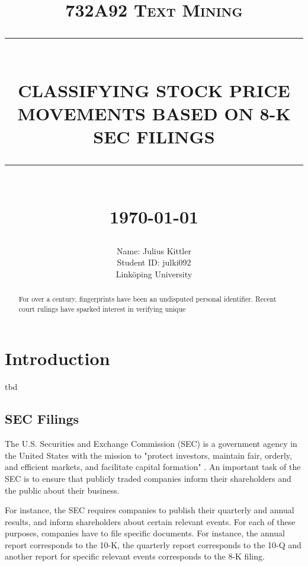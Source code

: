 \documentclass{article}
\newcommand{\HRule}[1]{\rule{\linewidth}{#1}}
\begin{document}
	
	\title{\textsc{732A92 Text Mining} \\ [2.0cm]
		\HRule{0.5pt} \\
		\LARGE \textbf{\uppercase{Classifying Stock Price Movements based on 8-K SEC filings}}
		\HRule{2pt} \\ [0.5cm]
		\normalsize \today \vspace*{5\baselineskip}}
	
	\date{}
	
	\author{
		Name: Julius Kittler \\ 
		Student ID: julki092 \\ 
		Link\"{o}ping University}
	
	\maketitle
	\newpage
	
	\begin{abstract}
		For over a century, fingerprints have been an undisputed
		personal identifier.  Recent court rulings have sparked
		interest in verifying unique
	\end{abstract}

	\tableofcontents
	\newpage

	\section{Introduction}
	
	tbd

	\subsection{SEC Filings}
	
	The U.S. Securities and Exchange Commission (SEC) is a government agency in the United States with the mission to "protect investors, maintain fair, orderly, and efficient markets, and facilitate capital formation" \cite{noauthor_sec.gov_nodate}. An important task of the SEC is to ensure that publicly traded companies inform their shareholders and the public about their business.
	
	For instance, the SEC requires companies to publish their quarterly and annual results, and inform shareholders about certain relevant events. For each of these purposes, companies have to file specific documents. For instance, the annual report corresponds to the 10-K, the quarterly report corresponds to the 10-Q and another report for specific relevant events corresponds to the 8-K filing.
	
\end{document}
